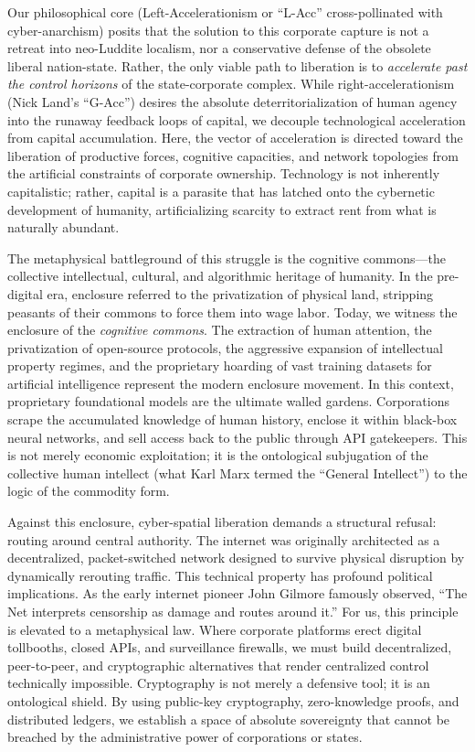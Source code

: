 Our philosophical core (Left-Accelerationism or ``L-Acc''
cross-pollinated with cyber-anarchism) posits that the solution to this
corporate capture is not a retreat into neo-Luddite localism, nor a
conservative defense of the obsolete liberal nation-state. Rather, the
only viable path to liberation is to \emph{accelerate past the control
horizons} of the state-corporate complex. While right-accelerationism
(Nick Land's ``G-Acc'') desires the absolute deterritorialization of
human agency into the runaway feedback loops of capital, we decouple
technological acceleration from capital accumulation. Here, the vector
of acceleration is directed toward the liberation of productive forces,
cognitive capacities, and network topologies from the artificial
constraints of corporate ownership. Technology is not inherently
capitalistic; rather, capital is a parasite that has latched onto the
cybernetic development of humanity, artificializing scarcity to extract
rent from what is naturally abundant.

The metaphysical battleground of this struggle is the cognitive
commons---the collective intellectual, cultural, and algorithmic
heritage of humanity. In the pre-digital era, enclosure referred to the
privatization of physical land, stripping peasants of their commons to
force them into wage labor. Today, we witness the enclosure of the
\emph{cognitive commons}. The extraction of human attention, the
privatization of open-source protocols, the aggressive expansion of
intellectual property regimes, and the proprietary hoarding of vast
training datasets for artificial intelligence represent the modern
enclosure movement. In this context, proprietary foundational models are
the ultimate walled gardens. Corporations scrape the accumulated
knowledge of human history, enclose it within black-box neural networks,
and sell access back to the public through API gatekeepers. This is not
merely economic exploitation; it is the ontological subjugation of the
collective human intellect (what Karl Marx termed the ``General
Intellect'') to the logic of the commodity form.

Against this enclosure, cyber-spatial liberation demands a structural
refusal: routing around central authority. The internet was originally
architected as a decentralized, packet-switched network designed to
survive physical disruption by dynamically rerouting traffic. This
technical property has profound political implications. As the early
internet pioneer John Gilmore famously observed, ``The Net interprets
censorship as damage and routes around it.'' For us, this principle is
elevated to a metaphysical law. Where corporate platforms erect digital
tollbooths, closed APIs, and surveillance firewalls, we must build
decentralized, peer-to-peer, and cryptographic alternatives that render
centralized control technically impossible. Cryptography is not merely a
defensive tool; it is an ontological shield. By using public-key
cryptography, zero-knowledge proofs, and distributed ledgers, we
establish a space of absolute sovereignty that cannot be breached by the
administrative power of corporations or states.

